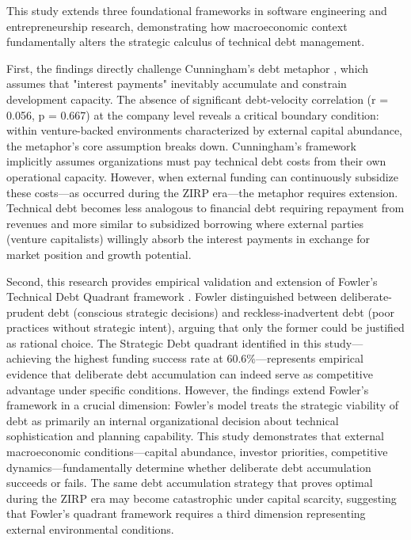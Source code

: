 This study extends three foundational frameworks in software engineering and entrepreneurship research, demonstrating how macroeconomic context fundamentally alters the strategic calculus of technical debt management.

First, the findings directly challenge Cunningham's debt metaphor \citep{cunningham1992wycash}, which assumes that "interest payments" inevitably accumulate and constrain development capacity. The absence of significant debt-velocity correlation (r = 0.056, p = 0.667) at the company level reveals a critical boundary condition: within venture-backed environments characterized by external capital abundance, the metaphor's core assumption breaks down. Cunningham's framework implicitly assumes organizations must pay technical debt costs from their own operational capacity. However, when external funding can continuously subsidize these costs—as occurred during the \ac{ZIRP} era—the metaphor requires extension. Technical debt becomes less analogous to financial debt requiring repayment from revenues and more similar to subsidized borrowing where external parties (venture capitalists) willingly absorb the interest payments in exchange for market position and growth potential.

Second, this research provides empirical validation and extension of Fowler's Technical Debt Quadrant framework \citep{fowler2009technical}. Fowler distinguished between deliberate-prudent debt (conscious strategic decisions) and reckless-inadvertent debt (poor practices without strategic intent), arguing that only the former could be justified as rational choice. The Strategic Debt quadrant identified in this study—achieving the highest funding success rate at 60.6\%—represents empirical evidence that deliberate debt accumulation can indeed serve as competitive advantage under specific conditions. However, the findings extend Fowler's framework in a crucial dimension: Fowler's model treats the strategic viability of debt as primarily an internal organizational decision about technical sophistication and planning capability. This study demonstrates that external macroeconomic conditions—capital abundance, investor priorities, competitive dynamics—fundamentally determine whether deliberate debt accumulation succeeds or fails. The same debt accumulation strategy that proves optimal during the \ac{ZIRP} era may become catastrophic under capital scarcity, suggesting that Fowler's quadrant framework requires a third dimension representing external environmental conditions.

